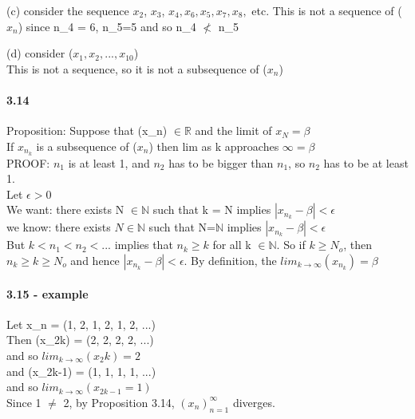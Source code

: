 \documentclass[10pt,letter]{article}
\begin{document}
(c) consider the sequence $x_2$, $x_3$, $x_4, x_6, x_5, x_7, x_8,$ etc. This is not a sequence of ($x_n$) since n_4 = 6, n_5=5 and so n_4 $\not<$ n_5

(d) consider ($x_1, x_2,..., x_10$)\\
This is not a sequence, so it is not a subsequence of ($x_n$)

\paragraph{3.14}
Proposition: Suppose that (x_n) $\in \mathbb{R}$ and the limit of $x_N = \beta$\\
If $x_{n_k}$ is a subsequence of ($x_n$) then lim as k approaches $\infty = \beta$\\

PROOF: $n_1$ is at least 1, and $n_2$ has to be bigger than $n_1$, so $n_2$ has to be at least 1. \\ 
Let $\epsilon > 0$\\
We want: there exists N $\in \mathbb{N}$ such that k = N implies $|x_{n_k} - \beta| < \epsilon$\\
we know: there exists $N \in \mathbb{N}$ such that N=$\mathbb{N}$ implies $|x_{n_k} - \beta| < \epsilon$\\
But $k<n_1<n_2<...$ implies that $n_k \geq k$ for all k $\in \mathbb{N}$. So if $k \geq N_o$, then $n_k \geq k \geq N_o$ and hence $|x_{n_k} - \beta| < \epsilon$. By definition, the $lim_{k\rightarrow\infty} (x_{n_k}) = \beta$

\paragraph{3.15 - example}
Let x_n = (1, 2, 1, 2, 1, 2, ...)\\
Then (x_2k) = (2, 2, 2, 2, ...)\\
and so $lim_{k\rightarrow\infty}(x_2k) = 2$\\
and (x_{2k-1}) = (1, 1, 1, 1, ...)\\
and so $lim_{k\rightarrow\infty}(x_{2k-1} = 1)$\\
Since 1 $\neq$ 2, by Proposition 3.14, $(x_n)_{n=1}^\infty$ diverges.\\
\end{document}
